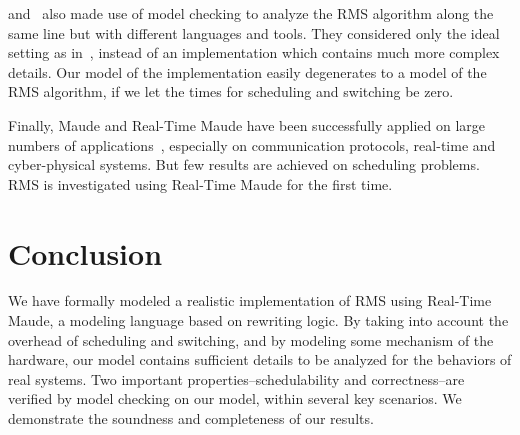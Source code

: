 \documentclass[10pt,journal]{IEEEtran}
\newcommand{\hide}[1]{\ignorespaces}
\begin{document}
\cite{DBLP:conf/iceccs/CuiDT14} and~\cite{TianD2011} also made use of
model checking to analyze the RMS algorithm along the same line but
with different languages and tools. They considered only the ideal
setting as in~\cite{DBLP:journals/jacm/LiuL73}, instead of an
implementation which contains much more complex details. Our model of
the implementation easily degenerates to a model of the RMS algorithm,
if we let the times for scheduling and switching be zero.

Finally, Maude and Real-Time Maude have been successfully applied on
large numbers of applications~\cite{DBLP:journals/jlp/Meseguer12},
especially on communication protocols, real-time and cyber-physical
systems. But few results are achieved on scheduling problems. RMS is
investigated using Real-Time Maude for the first time.

\section{Conclusion}
\label{s:conclusion}
We have formally modeled a realistic implementation of RMS using
Real-Time Maude, a modeling language based on rewriting logic. By
taking into account the overhead of scheduling and switching, and by
modeling some mechanism of the hardware, our model contains sufficient
details to be analyzed for the behaviors of real systems. Two
important properties--schedulability and correctness--are verified by
model checking on our model, within several key scenarios. We
demonstrate the soundness and completeness of our results.


\hide{
\ifCLASSOPTIONcompsoc
  \section*{Acknowledgments}
\else
  \section*{Acknowledgment}
\fi

The authors would like to thank...
}

\ifCLASSOPTIONcaptionsoff
  \newpage
\fi



\end{document}

